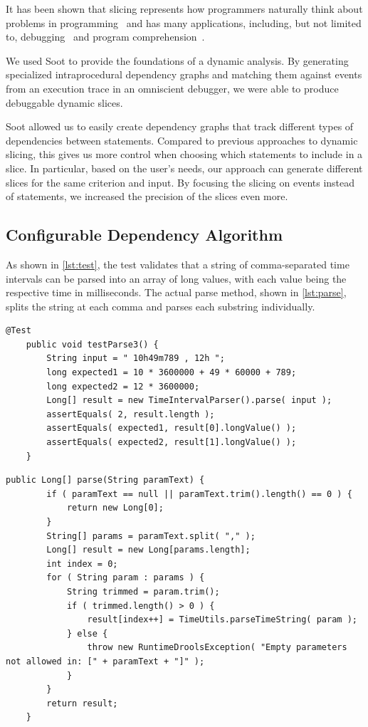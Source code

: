 \documentclass[english]{scrartcl}
\begin{document}
It has been shown that slicing represents how programmers naturally think about problems in programming~\cite{weiser_programmers_1982} and has many applications, including, but not limited to, debugging~\cite{agrawal_debugging_1993} and program comprehension~\cite{de_lucia_program_2001}.

We used Soot to provide the foundations of a dynamic analysis.
By generating specialized intraprocedural dependency graphs and matching them against events from an execution trace in an omniscient debugger, we were able to produce debuggable dynamic slices.

Soot allowed us to easily create dependency graphs that track different types of dependencies between statements.
Compared to previous approaches to dynamic slicing, this gives us more control when choosing which statements to include in a slice.
In particular, based on the user's needs, our approach can generate different slices for the same criterion and input.
By focusing the slicing on events instead of statements, we increased the precision of the slices even more.

\subsection{Configurable Dependency Algorithm}

As shown in \autoref{lst:test}, the test validates that a string of comma-separated time intervals can be parsed into an array of long values, with each value being the respective time in milliseconds.
The actual parse method, shown in \autoref{lst:parse}, splits the string at each comma and parses each substring individually.

\begin{lstlisting}[firstnumber=54,float,caption={A test in TimeIntervalParserTest.java},stepnumber=2,label=lst:test]
    @Test
    public void testParse3() {
        String input = " 10h49m789 , 12h ";
        long expected1 = 10 * 3600000 + 49 * 60000 + 789;
        long expected2 = 12 * 3600000;
        Long[] result = new TimeIntervalParser().parse( input );
        assertEquals( 2, result.length );
        assertEquals( expected1, result[0].longValue() );
        assertEquals( expected2, result[1].longValue() );
    }
\end{lstlisting}

\begin{lstlisting}[firstnumber=34,float,caption={The method under test, implemented in TimeIntervalParser.java},stepnumber=2,label=lst:parse]
    public Long[] parse(String paramText) {
        if ( paramText == null || paramText.trim().length() == 0 ) {
            return new Long[0];
        }
        String[] params = paramText.split( "," );
        Long[] result = new Long[params.length];
        int index = 0;
        for ( String param : params ) {
            String trimmed = param.trim();
            if ( trimmed.length() > 0 ) {
                result[index++] = TimeUtils.parseTimeString( param );
            } else {
                throw new RuntimeDroolsException( "Empty parameters not allowed in: [" + paramText + "]" );
            }
        }
        return result;
    }
\end{lstlisting}
\end{document}

